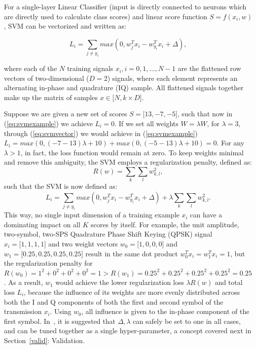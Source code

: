 For a single-layer Linear Classifier (input is directly connected to neurons which are directly used to calculate class scores) and linear score function $S = f(x_i,w)$, SVM can be vectorized and written as:

\begin{equation}
\label{eq:svmvector}
L_i = \sum_{j\neq y_i} max(0, w_j^Tx_i - w_{y_i}^Tx_i+\Delta),
\end{equation}

where each of the $N$ training signals $x_i, i=0,1,...,N-1$ are the flattened row vectors of two-dimensional ($D = 2$) signals, where each element represents an alternating in-phase and quadrature (IQ) sample. All flattened signals together make up the matrix of samples $x \in \lbrack N, k \times D \rbrack$.

Suppose we are given a new set of scores $S=\lbrack 13, -7, -5 \rbrack$, such that now in (\ref{eq:svmexample}) we achieve $L_i = 0$. If we set all weights $W = \lambda W$, for $\lambda = 3$, through (\ref{eq:svmvector}) we would achieve in (\ref{eq:svmexample}) $L_i = max(0, (-7-13)\lambda+10) + max(0, (-5-13)\lambda+10) = 0$. For any $\lambda>1$, in fact, the loss function would remain at zero. To keep weights minimal and remove this ambiguity, the SVM employs a regularization penalty, defined as:
\begin{equation}
\label{eq:regpen}
R(w)=\sum_k\sum_l w_{k,l}^2,
\end{equation}
such that the SVM is now defined as:
\begin{equation}
L_i = \sum_{j\neq y_i} max(0, w_j^Tx_i - w_{y_i}^Tx_i+\Delta) + \lambda\sum_k\sum_l w_{k,l}^2.
\end{equation}
This way, no single input dimension of a training example $x_i$ can have a dominating impact on all $K$ scores by itself. For example, the unit amplitude, two-symbol, two-SPS Quadrature Phase Shift Keying (QPSK) signal $x_i = \lbrack 1,1,1,1 \rbrack$ and two weight vectors $w_0 = \lbrack 1,0,0,0 \rbrack$ and $w_1 = \lbrack 0.25,0.25,0.25,0.25 \rbrack$ result in the same dot product $w_0^Tx_i=w_1^Tx_i=1$, but the regularization penalty for $R(w_0) = 1^2 + 0^2+0^2+0^2=1 > R(w_1)=0.25^2+0.25^2+0.25^2+0.25^2=0.25$. As a result, $w_1$ would achieve the lower regularization loss $\lambda R(w)$ and total loss $L_i$, because the influence of its weights are more evenly distributed across both the I and Q components of both the first and second symbol of the transmission $x_i$. Using $w_0$, all influence is given to the in-phase component of the first symbol. In~\cite{cs231}, it is suggested that $\Delta, \lambda$ can safely be set to one in all cases, and can be tuned together as a single hyper-parameter, a concept covered next in Section~\ref{valid}: Validation.

